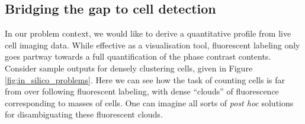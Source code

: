 %

%

\subsection{Bridging the gap to cell detection}

In our problem context, we would like to derive a quantitative profile from live cell imaging data. While effective as a visualisation tool, fluorescent labeling only goes partway towards a full quantification of the phase contrast contents. Consider sample outputs for densely clustering cells, given in Figure \ref{fig:in_silico_problems}. Here we can see how the task of counting cells is far from over following fluorescent labeling, with dense ``clouds'' of fluorescence corresponding to masses of cells. One can imagine all sorts of \emph{post hoc} solutions for disambiguating these fluorescent clouds.

